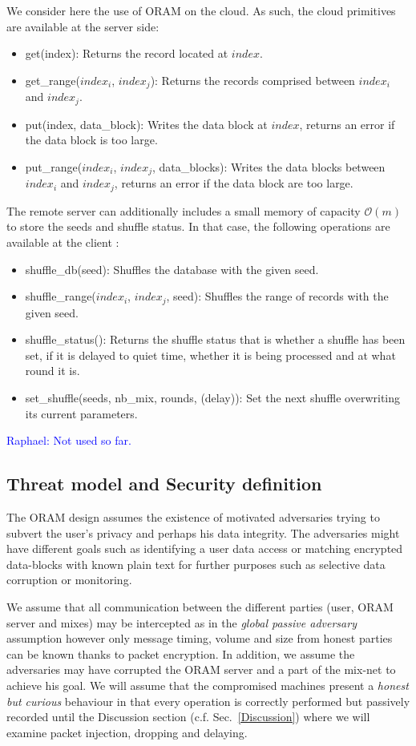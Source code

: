 \documentclass{llncs}
\newcommand{\raphael}[1]{\textcolor{blue}{Raphael: #1}}
\begin{document}
We consider here the use of ORAM on the cloud. As such, the cloud primitives are available at the server side:
\begin{itemize}
 \item get(index): Returns the record located at $index$.
 \item get\_range($index_i$, $index_j$): Returns the records comprised between $index_i$ and $index_j$.
 \item put(index, data\_block):  Writes the data block at $index$, returns an error if the data block is too large.
 \item put\_range($index_i$, $index_j$, data\_blocks): Writes the data blocks between $index_i$ and $index_j$, returns an error if the data block are too large.
\end{itemize}

The remote server can additionally includes a small memory of capacity $\mathcal{O}(m)$ to store the seeds and shuffle status. In that case, the following operations are available at the client :
\begin{itemize}
 \item shuffle\_db(seed): Shuffles the database with the given seed.
 \item shuffle\_range($index_i$, $index_j$, seed): Shuffles the range of records with the given seed.
 \item shuffle\_status(): Returns the shuffle status that is whether a shuffle has been set, if it is delayed to quiet time, whether it is being processed and at what round it is.
 \item set\_shuffle(seeds, nb\_mix, rounds, (delay)): Set the next shuffle overwriting its current parameters.
\end{itemize}
\raphael{Not used so far.}
%
\subsection{Threat model and Security definition}

The ORAM design assumes the existence of motivated adversaries trying to subvert the user's privacy and perhaps his data integrity.
The adversaries might have different goals such as identifying a user data access or matching encrypted data-blocks with known plain text for further purposes such as selective data corruption or monitoring.

We assume that all communication between the different parties (user, ORAM server and mixes) may be intercepted as in the \textit{global passive adversary} assumption however only message timing, volume and size from honest parties can be known thanks to packet encryption.
In addition, we assume the adversaries may have corrupted the ORAM server and a part of the mix-net to achieve his goal.
We will assume that the compromised machines present a \textit{honest but curious} behaviour in that every operation is correctly performed but passively recorded until the Discussion section (c.f. Sec.~\ref{Discussion}) where we will examine packet injection, dropping and delaying.
\end{document}
